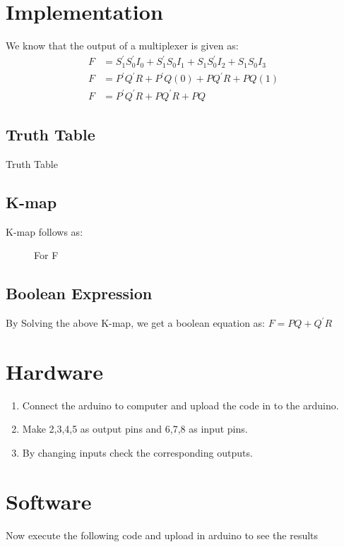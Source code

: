 \documentclass{article}
\begin{document}
\section{Implementation}
We know that the output of a multiplexer is given as:
\begin{align}
F&=S_1^\prime S_0^\prime I_0+S_1^\prime S_0I_1+S_1S_0^\prime I_2+S_1S_0I_3\\ 
F&=P^\prime Q^\prime{R}+P^\prime Q(0)+PQ^\prime R+PQ(1)\\
F&=P^\prime Q^\prime R+PQ^\prime R+PQ
\end{align}
\subsection{Truth Table}
\begin{table}[!h]
\centering

\caption{Truth Table}
\label{table:Truth Table}
\end{table}
%
\subsection{K-map}
K-map follows as:
\begin{figure}[!h]
\begin{center}
\resizebox{0.5\columnwidth}{!}{

}
\end{center}
\caption{For F}
\label{fig:k-map}
\end{figure}
%
\pagebreak
\subsection{Boolean Expression}
By Solving the above K-map, we get a boolean equation as: $F=PQ+{Q^\prime}R$

\section{Hardware}
\begin{enumerate}
\item Connect the arduino to computer and upload the code in to the arduino.
\item Make 2,3,4,5 as output pins and 6,7,8 as input pins.
\item By changing inputs check the corresponding outputs.
\end{enumerate}

\section{Software}
Now execute the following code  and upload  in arduino to see the results

\end{document}
